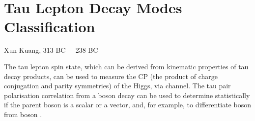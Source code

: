 \chapter{Tau Lepton Decay Modes Classification}
\label{chap:Tau}

%
{Xun Kuang, 313 BC $-$ 238 BC}%

The tau lepton spin state, which can be derived from kinematic properties of tau decay products, can be used to measure the CP (the product of charge conjugation and parity symmetries) of the Higgs, via \HiggsToTauTau channel\cite{Berge:2015nua}. The tau pair polarisation correlation from a boson decay can be used to determine statistically if the parent boson is a  scalar or a vector, and, for example, to differentiate \PH boson from  \PZ boson \cite{Bullock:1991my}.


